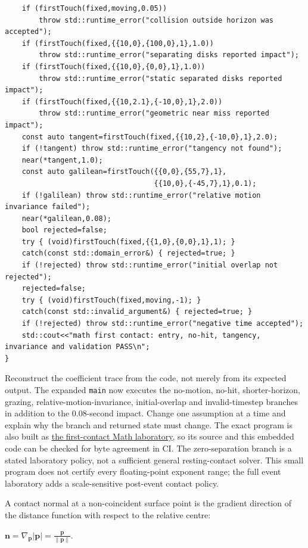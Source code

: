 \begin{verbatim}
    if (firstTouch(fixed,moving,0.05))
        throw std::runtime_error("collision outside horizon was accepted");
    if (firstTouch(fixed,{{10,0},{100,0},1},1.0))
        throw std::runtime_error("separating disks reported impact");
    if (firstTouch(fixed,{{10,0},{0,0},1},1.0))
        throw std::runtime_error("static separated disks reported impact");
    if (firstTouch(fixed,{{10,2.1},{-10,0},1},2.0))
        throw std::runtime_error("geometric near miss reported impact");
    const auto tangent=firstTouch(fixed,{{10,2},{-10,0},1},2.0);
    if (!tangent) throw std::runtime_error("tangency not found");
    near(*tangent,1.0);
    const auto galilean=firstTouch({{0,0},{55,7},1},
                                   {{10,0},{-45,7},1},0.1);
    if (!galilean) throw std::runtime_error("relative motion invariance failed");
    near(*galilean,0.08);
    bool rejected=false;
    try { (void)firstTouch(fixed,{{1,0},{0,0},1},1); }
    catch(const std::domain_error&) { rejected=true; }
    if (!rejected) throw std::runtime_error("initial overlap not rejected");
    rejected=false;
    try { (void)firstTouch(fixed,moving,-1); }
    catch(const std::invalid_argument&) { rejected=true; }
    if (!rejected) throw std::runtime_error("negative time accepted");
    std::cout<<"math first contact: entry, no-hit, tangency, invariance and validation PASS\n";
}
\end{verbatim}

Reconstruct the coefficient trace from the code, not merely from its expected output. The expanded \texttt{main} now executes the no-motion, no-hit, shorter-horizon, grazing, relative-motion-invariance, initial-overlap and invalid-timestep branches in addition to the 0.08-second impact. Change one assumption at a time and explain why the branch and returned state must change. The exact program is also built as \hyperref[source-file-c54e3c362767ccd1911378ae]{the first-contact Math laboratory}, so its source and this embedded code can be checked for byte agreement in CI. The zero-separation branch is a stated laboratory policy, not a sufficient general resting-contact solver. This small program does not certify every floating-point exponent range; the full event laboratory adds a scale-sensitive post-event contact policy.

A contact normal at a non-coincident surface point is the gradient direction of the distance function with respect to the relative centre:

\(\mathbf n=\nabla_{\mathbf p}|\mathbf p| =\frac{\mathbf p}{\|\mathbf p\|}.\)


